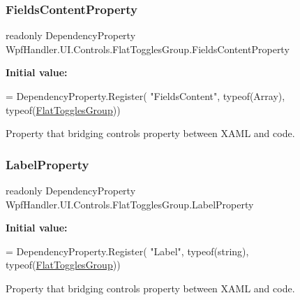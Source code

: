 \subsubsection{\texorpdfstring{Fields\+Content\+Property}{FieldsContentProperty}}
{\footnotesize\ttfamily readonly Dependency\+Property Wpf\+Handler.\+U\+I.\+Controls.\+Flat\+Toggles\+Group.\+Fields\+Content\+Property\hspace{0.3cm}{\ttfamily [static]}}

{\bfseries Initial value\+:}
\begin{DoxyCode}
= DependencyProperty.Register(
          \textcolor{stringliteral}{"FieldsContent"}, typeof(Array), typeof(\mbox{\hyperlink{class_wpf_handler_1_1_u_i_1_1_controls_1_1_flat_toggles_group_a026f873b2f214e35ee3f3ad5715e1bad}{FlatTogglesGroup}}))
\end{DoxyCode}


Property that bridging control\textquotesingle{}s property between X\+A\+ML and code. 

\mbox{\label{class_wpf_handler_1_1_u_i_1_1_controls_1_1_flat_toggles_group_a72591a66a8b72130cf16e966bbed5507}} 
\subsubsection{\texorpdfstring{Label\+Property}{LabelProperty}}
{\footnotesize\ttfamily readonly Dependency\+Property Wpf\+Handler.\+U\+I.\+Controls.\+Flat\+Toggles\+Group.\+Label\+Property\hspace{0.3cm}{\ttfamily [static]}}

{\bfseries Initial value\+:}
\begin{DoxyCode}
= DependencyProperty.Register(
          \textcolor{stringliteral}{"Label"}, typeof(\textcolor{keywordtype}{string}), typeof(\mbox{\hyperlink{class_wpf_handler_1_1_u_i_1_1_controls_1_1_flat_toggles_group_a026f873b2f214e35ee3f3ad5715e1bad}{FlatTogglesGroup}}))
\end{DoxyCode}


Property that bridging control\textquotesingle{}s property between X\+A\+ML and code. 

